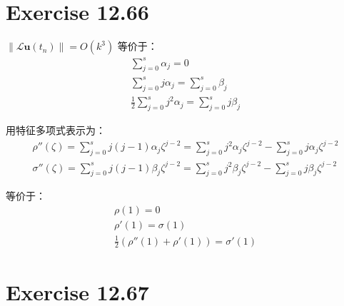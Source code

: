 \documentclass[a4paper]{article}
\begin{document}
\section*{Exercise 12.66}

\par $\left\|\mathcal{L}\mathbf{u}(t_n)\right\|=O(k^3)$ 等价于：
\begin{gather}
    \sum_{j=0}^{s}\alpha_j = 0\\
    \sum_{j=0}^{s} j \alpha_j = \sum_{j=0}^{s} \beta_j\\
    \frac{1}{2}\sum_{j=0}^{s} j^2 \alpha_j = \sum_{j=0}^{s} j \beta_j
\end{gather}
\par 用特征多项式表示为：
\begin{gather}
    \rho''(\zeta) = \sum_{j=0}^{s} j(j-1)\alpha_j \zeta^{j-2}
    =\sum_{j=0}^{s} j^2\alpha_j \zeta^{j-2}-\sum_{j=0}^{s} j \alpha_j \zeta^{j-2}\\
    \sigma''(\zeta) = \sum_{j=0}^{s} j(j-1)\beta_j \zeta^{j-2}
    =\sum_{j=0}^{s} j^2\beta_j \zeta^{j-2}-\sum_{j=0}^{s} j \beta_j \zeta^{j-2}
\end{gather}
\par 等价于：
\begin{gather}
    \rho(1) = 0\\
    \rho'(1) = \sigma(1)\\
    \frac{1}{2}\left(
        \rho''(1)
        +\rho'(1)
    \right) = \sigma'(1)
\end{gather}

\section*{Exercise 12.67}
\end{document}

